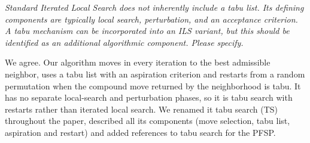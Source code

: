 \documentclass[12pt]{article}
\newenvironment{rc}[1]{\par\medskip\noindent\itshape\renewcommand{\emph}[1]{\textbf{##1}}\ignorespaces}{\par}
\newcommand{\answer}[1]{\par\smallskip\noindent #1\par}
\begin{document}
\begin{rc}{R2 ILS --- Tabu list in Iterated Local Search}
Standard Iterated Local Search does not inherently include a tabu list. Its defining components are typically local search, perturbation, and an acceptance criterion. A tabu mechanism can be incorporated into an ILS variant, but this should be identified as an additional algorithmic component. Please specify.
\end{rc}
\answer{We agree. Our algorithm moves in every iteration to the best admissible neighbor, uses a tabu list with an aspiration criterion and restarts from a random permutation when the compound move returned by the neighborhood is tabu. It has no separate local-search and perturbation phases, so it is tabu search with restarts rather than iterated local search. We renamed it tabu search (TS) throughout the paper, described all its components (move selection, tabu list, aspiration and restart) and added references to tabu search for the PFSP.}
\end{document}
